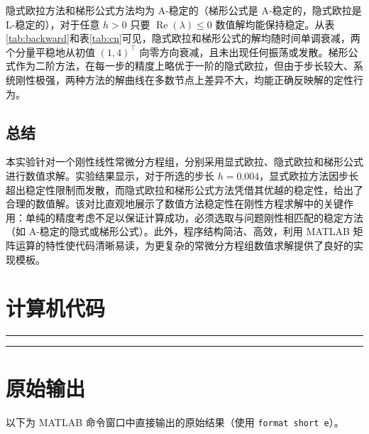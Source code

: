 \documentclass[12pt,a4paper]{article}
\begin{document}
隐式欧拉方法和梯形公式方法均为 A-稳定的（梯形公式是 A-稳定的，隐式欧拉是 L-稳定的），对于任意 \(h>0\) 只要 \(\operatorname{Re}(\lambda) \le 0\) 数值解均能保持稳定。从表\ref{tab:backward}和表\ref{tab:cn}可见，隐式欧拉和梯形公式的解均随时间单调衰减，两个分量平稳地从初值 \((1,4)^\top\) 向零方向衰减，且未出现任何振荡或发散。梯形公式作为二阶方法，在每一步的精度上略优于一阶的隐式欧拉，但由于步长较大、系统刚性极强，两种方法的解曲线在多数节点上差异不大，均能正确反映解的定性行为。

\subsection{总结}

本实验针对一个刚性线性常微分方程组，分别采用显式欧拉、隐式欧拉和梯形公式进行数值求解。实验结果显示，对于所选的步长 \(h=0.004\)，显式欧拉方法因步长超出稳定性限制而发散，而隐式欧拉和梯形公式方法凭借其优越的稳定性，给出了合理的数值解。该对比直观地展示了数值方法稳定性在刚性方程求解中的关键作用：单纯的精度考虑不足以保证计算成功，必须选取与问题刚性相匹配的稳定方法（如 A-稳定的隐式或梯形公式）。此外，程序结构简洁、高效，利用 MATLAB 矩阵运算的特性使代码清晰易读，为更复杂的常微分方程组数值求解提供了良好的实现模板。

\newpage
\section{计算机代码}

\small
\hrule

\hrule

\newpage
\section{原始输出}
以下为 MATLAB 命令窗口中直接输出的原始结果（使用 \texttt{format short e}）。
\end{document}
